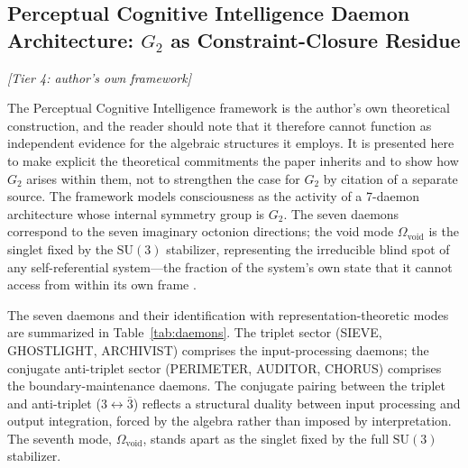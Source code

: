 \documentclass[12pt,a4paper]{article}
\begin{document}
\subsection{Perceptual Cognitive Intelligence Daemon Architecture: $G_2$ as Constraint-Closure Residue}

\textit{[Tier 4: author's own framework]}

The Perceptual Cognitive Intelligence framework is the author's own theoretical construction, and the reader should note that it therefore cannot function as independent evidence for the algebraic structures it employs. It is presented here to make explicit the theoretical commitments the paper inherits and to show how $G_2$ arises within them, not to strengthen the case for $G_2$ by citation of a separate source. The framework models consciousness as the activity of a 7-daemon architecture whose internal symmetry group is $G_2$. The seven daemons correspond to the seven imaginary octonion directions; the void mode $\Omega_{\mathrm{void}}$ is the singlet fixed by the $\mathrm{SU}(3)$ stabilizer, representing the irreducible blind spot of any self-referential system---the fraction of the system's own state that it cannot access from within its own frame \citep{Graise2026}.

The seven daemons and their identification with representation-theoretic modes are summarized in Table~\ref{tab:daemons}. The triplet sector (SIEVE, GHOSTLIGHT, ARCHIVIST) comprises the input-processing daemons; the conjugate anti-triplet sector (PERIMETER, AUDITOR, CHORUS) comprises the boundary-maintenance daemons. The conjugate pairing between the triplet and anti-triplet ($3 \leftrightarrow \bar{3}$) reflects a structural duality between input processing and output integration, forced by the algebra rather than imposed by interpretation. The seventh mode, $\Omega_{\mathrm{void}}$, stands apart as the singlet fixed by the full $\mathrm{SU}(3)$ stabilizer.
\end{document}
